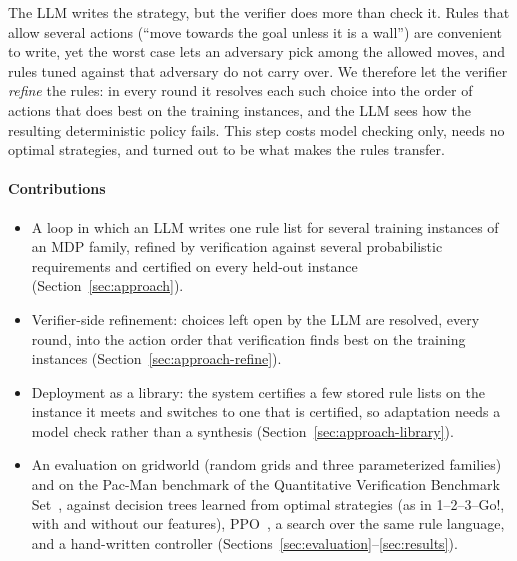 The LLM writes the strategy, but the verifier does more than check it. Rules that allow several actions (``move
towards the goal unless it is a wall'') are convenient to write, yet the worst case lets an adversary pick among the
allowed moves, and rules tuned against that adversary do not carry over. We therefore let the verifier
\emph{refine} the rules: in every round it resolves each such choice into the order of actions that does best on the
training instances, and the LLM sees how the resulting deterministic policy fails. This step costs model checking
only, needs no optimal strategies, and turned out to be what makes the rules transfer.

\paragraph*{Contributions}
\begin{itemize}
  \item A loop in which an LLM writes one rule list for several training instances of an MDP family, refined by
        verification against several probabilistic requirements and certified on every held-out instance
        (Section~\ref{sec:approach}).
  \item Verifier-side refinement: choices left open by the LLM are resolved, every round, into the action order that
        verification finds best on the training instances (Section~\ref{sec:approach-refine}).
  \item Deployment as a library: the system certifies a few stored rule lists on the instance it meets and switches to
        one that is certified, so adaptation needs a model check rather than a synthesis
        (Section~\ref{sec:approach-library}).
  \item An evaluation on gridworld (random grids and three parameterized families) and on the Pac-Man benchmark of
        the Quantitative Verification Benchmark Set~\cite{hartmanns2019qcomp}, against decision trees learned from
        optimal strategies (as in 1--2--3--Go!, with and without our features), PPO~\cite{schulman2017ppo}, a search
        over the same rule language, and a hand-written controller (Sections~\ref{sec:evaluation}--\ref{sec:results}).
\end{itemize}

